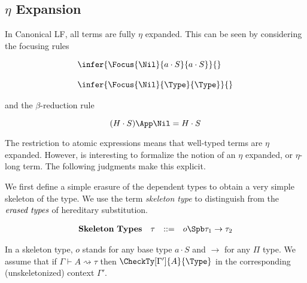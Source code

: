 

\subsection{$\eta$ Expansion}

In Canonical LF, all terms are fully $\eta$ expanded.  This can be seen
by considering the focusing rules

$$
\begin{array}{lr}
\infer{\Focus{\Nil}{a\cdot S}{a\cdot S}}{}\\
\\
\infer{\Focus{\Nil}{\Type}{\Type}}{} 
\end{array} 
$$

and the $\beta$-reduction rule

$$
(H\cdot S)\App\Nil = H\cdot S
$$

The restriction to atomic expressions means that well-typed terms
are $\eta$ expanded.  However, is interesting to formalize the notion
of an $\eta$ expanded, or $\eta$-long term.  The following judgments
make this explicit.



We first define a simple erasure of the dependent types to obtain
a very simple skeleton of the type.  We use the term \emph{skeleton type}
to distinguish from the $\emph{erased types}$ of hereditary substitution.

\newcommand{\Skel}[3][\Gamma]{#1\vdash #2 \rightsquigarrow #3}
\newcommand{\SkBase}{o}
\newcommand{\tauskel}{\tau_1\to\tau_2\to\ldots\to\tau_n\to\SkBase}

\bigskip 
$$
\begin{array}{llll}
\mathbf{Skeleton\ Types} & \tau & ::= & \SkBase \Spb \tau_1\to\tau_2 \\
\end{array} 
$$
\bigskip 

In a skeleton type, $o$ stands for any base type $a\cdot S$ and $\to$ for any $\Pi$ type.
We assume that if $\Skel{A}{\tau}$ then $\CheckTy[\Gamma']{A}{\Type}$ in the corresponding
(unskeletonized) context $\Gamma'$.


